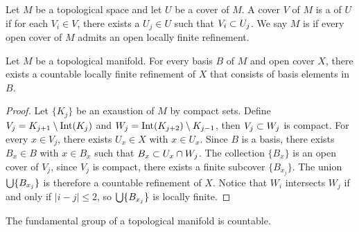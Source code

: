 \documentclass[10pt]{article}
\begin{document}
\begin{definition}
    Let $M$ be a topological space and let $U$ be a cover of $M$. A cover $V$ of $M$ is a  of $U$ if for each ${V}_{i}\in V$, there exists a ${U}_{j}\in U$ such that ${V}_{i}\subset{U}_{j}$. We say $M$ is  if every open cover of $M$ admits an open locally finite refinement.
\end{definition}
\begin{proposition}
    Let $M$ be a topological manifold. For every basis $B$ of $M$ and open cover $X$, there exists a countable locally finite refinement of $X$ that consists of basis elements in $B$.
\end{proposition}
\begin{proof}
    Let $\{{K}_{j}\}$ be an exaustion of $M$ by compact sets. Define ${V}_{j}={K}_{j+1}\setminus\operatorname{Int}({K}_{j})$ and ${W}_{j}=\operatorname{Int}({K}_{j+2})\setminus{K}_{j-1}$, then ${V}_{j}\subset{W}_{j}$ is compact. For every $x\in{V}_{j}$, there exists ${U}_{x}\in X$ with $x\in{U}_{x}$. Since $B$ is a basis, there exists ${B}_{x}\in B$ with $x\in{B}_{x}$ such that ${B}_{x}\subset{U}_{x}\cap{W}_{j}$. The collection $\{{B}_{x}\}$ is an open cover of ${V}_{j}$, since ${V}_{j}$ is compact, there exists a finite subcover $\{{B}_{{x}_{j}}\}$. The union $\bigcup\{{B}_{{x}_{j}}\}$ is therefore a countable refinement of $X$. Notice that ${W}_{i}$ intersects ${W}_{j}$ if and only if $|i-j|\le 2$, so $\bigcup\{{B}_{{x}_{j}}\}$ is locally finite.
\end{proof}
\begin{proposition}
    The fundamental group of a topological manifold is countable.
\end{proposition}
\end{document}
